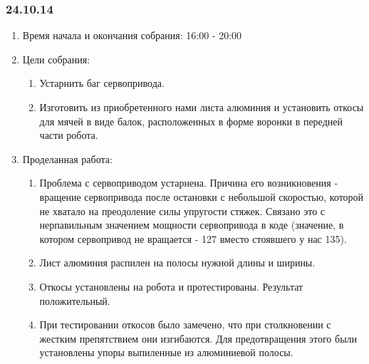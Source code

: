 
\subsubsection{24.10.14}

\begin{enumerate}
	\item Время начала и окончания собрания:
	16:00 - 20:00
	\item Цели собрания:
	\begin{enumerate}
	  \item Устарнить баг сервопривода.
	  
	  \item Изготовить из приобретенного нами листа алюминия и установить откосы для мячей в виде балок, расположенных в форме воронки в передней части робота.
	  
    \end{enumerate}
    
	\item Проделанная работа:
	\begin{enumerate}
	  \item Проблема с  сервоприводом устарнена. Причина его возникновения - вращение сервопривода после остановки с небольшой скоростью, которой не хватало на преодоление силы упругости стяжек. Связано это с нерпавильным значением мощности сервопривода в коде (значение, в котором сервопривод не вращается - 127 вместо стоявшего у нас 135).
      
      \item Лист алюминия распилен на полосы нужной длины и ширины.
      
      \item Откосы установлены на робота и протестированы. Результат положительный.
      
      \item При тестировании откосов было замечено, что при столкновении с жестким препятствием они изгибаются. Для предотвращения этого были установлены упоры выпиленные из алюминиевой полосы.
      

\end{enumerate}
\end{enumerate}
